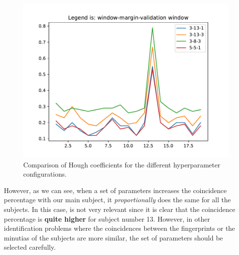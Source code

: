 \documentclass[a4paper]{article}
\begin{document}
\begin{figure}[H]
\centering
\includegraphics[scale=0.8]{Results}
\caption{Comparison of Hough coefficients for the different hyperparameter configurations.}
\label{fig:extra:comparison}
\end{figure}

However, as we can see, when a set of parameters increases the coincidence percentage with our main subject, it \emph{proportionally} does the same for all the subjects. In this case, is not very relevant since it is clear that the coincidence percentage is \textbf{quite higher} for subject number 13. However, in other identification problems where the coincidences between the fingerprints or the minutias of the subjects are more similar, the set of parameters should be selected carefully.
\end{document}
